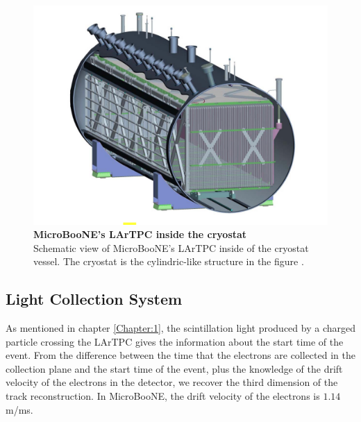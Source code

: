 \begin{figure}[h!]
    \begin{center}
        \includegraphics[scale=0.35]{Figures/uboone_cryo.png}
        \caption[MicroBooNE's LArTPC inside the cryostat]{{\textbf{MicroBooNE's LArTPC inside the cryostat}} \\ Schematic view of MicroBooNE's LArTPC inside of the cryostat vessel. The cryostat is the cylindric-like structure in the figure \cite{microboone_design}.}
        \label{uboone_cryo} 
    \end{center}
\end{figure}

\subsection{Light Collection System}

As mentioned in chapter \ref{Chapter:1}, the scintillation light produced by a charged particle crossing the LArTPC gives the information about the start time of the event. From the difference between the time that the electrons are collected in the collection plane and the start time of the event, plus the knowledge of the drift velocity of the electrons in the detector, we recover the third dimension of the track reconstruction. In MicroBooNE, the drift velocity of the electrons is $1.14$ m/ms. 

